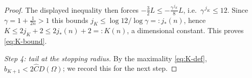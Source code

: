 \documentclass[11pt]{amsart}
\theoremstyle{definition}
\newcommand{\Om}{\Omega}
\begin{document}
\begin{proof}
The displayed inequality then forces
$-\tfrac32 L\le-\tfrac{\gamma^{\,j_K}}{8}L$, i.e.\
$\gamma^{\,j_K}\le12$.
Since $\gamma=1+\tfrac1{2n}>1$ this bounds
$j_K\le\log12/\log\gamma=:j_*(n)$, hence
$K\le2j_K+2\le2j_*(n)+2=:K(n)$, a dimensional constant. This proves
\eqref{eq:K-bound}.

\emph{Step 4: tail at the stopping radius.} By the maximality
\eqref{eq:K-def}, $b_{K+1}<2\widehat C D(\Om)$; we record this for the next
step.


\end{proof}
\end{document}
